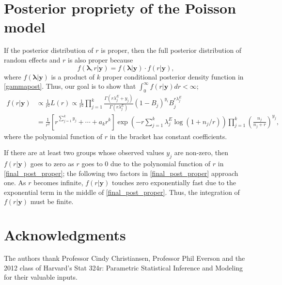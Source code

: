 \documentclass[article]{jss}
\begin{document}
\section{Posterior propriety of the Poisson model}\label{propriety_poisson}
If the posterior distribution of $r$ is proper, then the full posterior distribution of random effects and $r$ is also proper because 
\begin{equation}
f(\boldsymbol{\lambda}, r\vert \boldsymbol{y})=f(\boldsymbol{\lambda}\vert \boldsymbol{y})\cdot f(r\vert \boldsymbol{y}),
\end{equation} 
where $f(\boldsymbol{\lambda}\vert \boldsymbol{y})$ is a product of $k$ proper conditional posterior density function in \eqref{gammapost}. Thus, our goal is to show that $\int_0^\infty f(r\vert \boldsymbol{y})dr<\infty$;
\begin{align}
f(r\vert\boldsymbol{y})&\propto \frac{1}{r^2}L(r)\propto\frac{1}{r^2}\prod^{k}_{j=1} \frac{\Gamma(r \lambda^E_j+y_j)}{\Gamma(r\lambda^E_j)}(1-B_{j})^{y_{i}}B_{j}^{r \lambda^E_j}\\
&=\frac{1}{r^2}\left[r^{\sum_{j=1}^ky_j}+\cdots+a_k r^{k}\right]\exp\left(-r\sum_{j=1}^k\lambda^E_j\log(1+n_j/r)\right)\prod_{j=1}^k\left(\frac{n_j}{n_j+r}\right)^{y_j} \label{final_post_proper},
\end{align}
where the polynomial function of $r$ in the bracket has constant coefficients. 

If there are at least two groups whose observed values $y_j$ are non-zero, then $f(r\vert\boldsymbol{y})$ goes to zero as $r$ goes to 0 due to the polynomial function of $r$ in \eqref{final_post_proper}; the following two factors in \eqref{final_post_proper} approach one. As $r$ becomes infinite, $f(r\vert\boldsymbol{y})$ touches zero exponentially fast due to the exponential term in the middle of \eqref{final_post_proper}. Thus, the integration of $f(r\vert\boldsymbol{y})$ must be finite.



\section*{Acknowledgments}
The authors thank Professor Cindy Christiansen, Professor Phil Everson and the 2012 class of Harvard's Stat 324r: Parametric Statistical Inference and Modeling for their valuable inputs.



\end{document}
